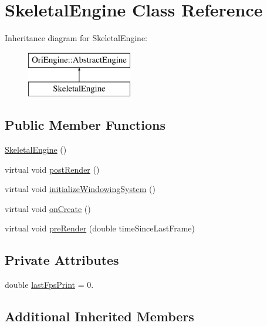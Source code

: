 \hypertarget{class_skeletal_engine}{}\section{Skeletal\+Engine Class Reference}
\label{class_skeletal_engine}
Inheritance diagram for Skeletal\+Engine\+:\begin{figure}[H]
\begin{center}
\leavevmode
\includegraphics[height=2.000000cm]{class_skeletal_engine}
\end{center}
\end{figure}
\subsection*{Public Member Functions}
\begin{DoxyCompactItemize}
\item 
\hyperlink{class_skeletal_engine_ac12b90e475584260e9fe507ea251b79f}{Skeletal\+Engine} ()
\item 
virtual void \hyperlink{class_skeletal_engine_a58981a23dad5e0bf14aadede98bba12f}{post\+Render} ()
\item 
virtual void \hyperlink{class_skeletal_engine_ab59e698fe322bf4e600b4e3b5cf62427}{initialize\+Windowing\+System} ()
\item 
virtual void \hyperlink{class_skeletal_engine_aa947bae905c4e4628bfe5036b4943a08}{on\+Create} ()
\item 
virtual void \hyperlink{class_skeletal_engine_a9d3352322b1c4c8aa6332765e8efcde6}{pre\+Render} (double time\+Since\+Last\+Frame)
\end{DoxyCompactItemize}
\subsection*{Private Attributes}
\begin{DoxyCompactItemize}
\item 
double \hyperlink{class_skeletal_engine_a88bfb5568460595bea7d703c14e0fd97}{last\+Fps\+Print} = 0.
\end{DoxyCompactItemize}
\subsection*{Additional Inherited Members}


